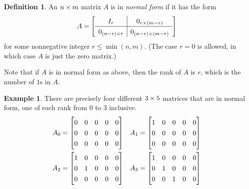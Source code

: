 \documentclass[reqno]{amsart}
\theoremstyle{definition}
\newtheorem{definition}[theorem]{Definition}
\newtheorem{example}[theorem]{Example}
\newcommand{\dfn}[1]{\emph{{#1}}\index{#1}}
\begin{document}
\begin{definition}\label{defn-normal-form}
 An $n\times m$ matrix $A$ is in \dfn{normal form} if it has the form
 \[ A = {\renewcommand{\arraystretch}{1.3}
     \left[\begin{array}{c|c}
      I_r & 0_{r\tm (m-r)} \\ \hline
      0_{(n-r)\tm r} & 0_{(n-r)\tm(m-r)}
     \end{array}\right]}
 \]
 for some nonnegative integer $r \leq \min(n, m)$.
 (The case $r=0$ is allowed, in which case $A$ is just
 the zero matrix.)
\end{definition}

Note that if $A$ is in normal form as above, then the rank of $A$ is
$r$, which is the number of $1$s in $A$.

\begin{example}\label{eg-normal-form}
 There are precisely four different $3\times 5$ matrices that are in
 normal form, one of each rank from $0$ to $3$ inclusive.
 \begin{align*}
  A_0 &= \bbm 0&0&0&0&0 \\ 0&0&0&0&0 \\ 0&0&0&0&0 \ebm &
  A_1 &= \bbm 1&0&0&0&0 \\ 0&0&0&0&0 \\ 0&0&0&0&0 \ebm \\
  A_2 &= \bbm 1&0&0&0&0 \\ 0&1&0&0&0 \\ 0&0&0&0&0 \ebm &
  A_3 &= \bbm 1&0&0&0&0 \\ 0&1&0&0&0 \\ 0&0&1&0&0 \ebm
 \end{align*}
\end{example}
\end{document}
